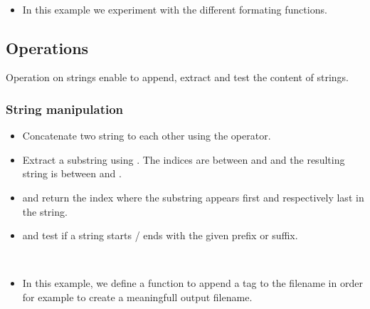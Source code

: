 \begin{frame}[fragile]
  \begin{example}~\par
    \begin{itemize}
    \item In this example we experiment with the different formating
      functions.~\par
      
    \end{itemize}
  \end{example}
\end{frame}

\subsection{Operations}

Operation on strings enable to append, extract and test the content of strings.

\begin{frame}
  \frametitle<presentation>{String manipulation}
  \begin{itemize}
    \item Concatenate two string to each other using the \code{+} operator.
    \item Extract a substring using . The indices are between  and
       and the resulting string is between
       and .
    \item {} and
       return the index where the
      substring appears first and respectively last in the string.
    \item {} and  test if a string starts / ends with the given prefix or
      suffix.
  \end{itemize}
\end{frame}

\begin{frame}[fragile]
  \begin{example}~\par
    \begin{itemize}
    \item In this example, we define a function to append a tag to the
      filename in order for example to create a meaningfull output
      filename.~\par
      
    \end{itemize}
  \end{example}
\end{frame}

